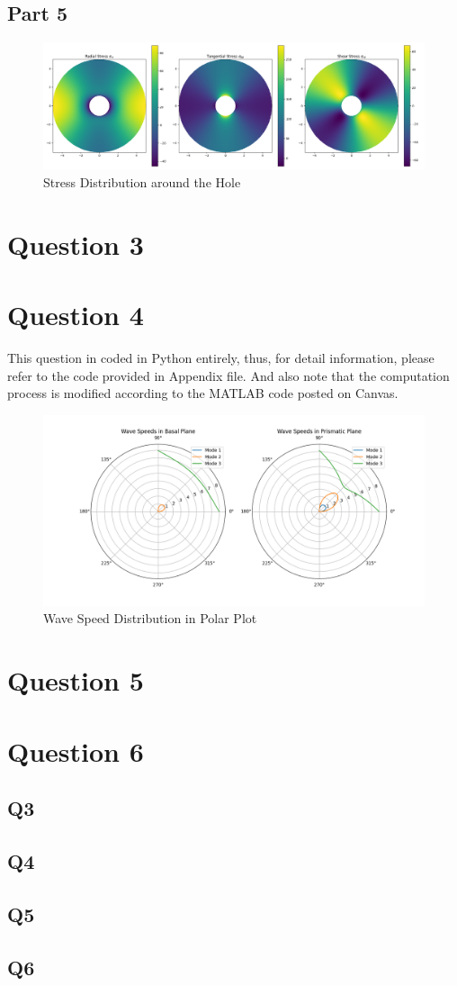 \documentclass[12pt]{article} %
\begin{document}
\subsection{Part 5}
\begin{figure}[ht]
    \centering
    \includegraphics[width=1\textwidth]{Q2.png}
    \caption{Stress Distribution around the Hole}
\end{figure}

\section{Question 3}
\clearpage
\section{Question 4}
This question in coded in Python entirely, thus, for detail information, please refer to the code provided in Appendix file.
And also note that the computation process is modified according to the MATLAB code posted on Canvas.
\begin{figure}[ht]
    \centering
    \includegraphics[width=1\textwidth]{Q4.png}
    \caption{Wave Speed Distribution in Polar Plot}
\end{figure}

\section{Question 5}
\section{Question 6}

\subsection*{Q3}
\subsection*{Q4}
\subsection*{Q5}
\subsection*{Q6}
\end{document}
